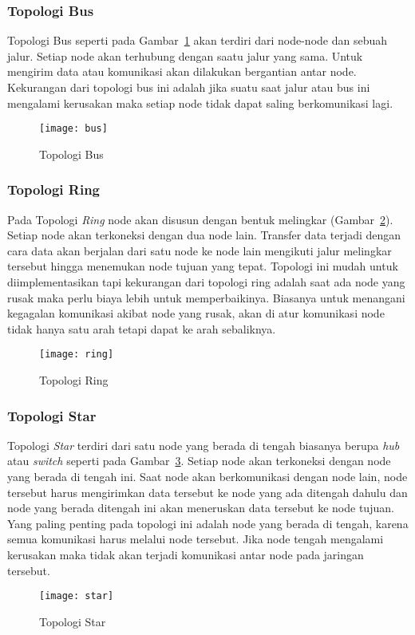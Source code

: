 \subsubsection{Topologi Bus}
Topologi Bus seperti pada Gambar~\ref{fig:bus} akan terdiri dari node-node dan sebuah jalur. Setiap node akan terhubung dengan saatu jalur yang sama. Untuk mengirim data atau komunikasi akan dilakukan bergantian antar node. Kekurangan dari topologi bus ini adalah jika suatu saat jalur atau bus ini mengalami kerusakan maka setiap node tidak dapat saling berkomunikasi lagi.
\begin{figure} [H]
	\centering  
	\texttt{[image: bus]}  
	\caption[Topologi Bus]{Topologi Bus} 
	\label{fig:bus} 
\end{figure} 

\subsubsection{Topologi Ring}
Pada Topologi \textit{Ring} node akan disusun dengan bentuk melingkar (Gambar~\ref{fig:ring}). Setiap node akan terkoneksi dengan dua node lain. Transfer data terjadi dengan cara data akan berjalan dari satu node ke node lain mengikuti jalur melingkar tersebut hingga menemukan node tujuan yang tepat. Topologi ini mudah untuk diimplementasikan tapi kekurangan dari topologi ring adalah saat ada node yang rusak maka perlu biaya lebih untuk memperbaikinya. Biasanya untuk menangani kegagalan komunikasi akibat node yang rusak, akan di atur komunikasi node tidak hanya satu arah tetapi dapat ke arah sebaliknya.
\begin{figure} [H]
	\centering  
	\texttt{[image: ring]}  
	\caption[Topologi Ring]{Topologi Ring} 
	\label{fig:ring} 
\end{figure} 

\subsubsection{Topologi Star}
Topologi \textit{Star} terdiri dari satu node yang berada di tengah biasanya berupa \textit{hub} atau \textit{switch} seperti pada Gambar~\ref{fig:star}. Setiap node akan terkoneksi dengan node yang berada di tengah ini. Saat node akan berkomunikasi dengan node lain, node tersebut harus mengirimkan data tersebut ke node yang ada ditengah dahulu dan node yang berada ditengah ini akan meneruskan data tersebut ke node tujuan. Yang paling penting pada topologi ini adalah node yang berada di tengah, karena semua komunikasi harus melalui node tersebut. Jika node tengah mengalami kerusakan maka tidak akan terjadi komunikasi antar node pada jaringan tersebut.
\begin{figure} [H]
	\centering  
	\texttt{[image: star]}  
	\caption[Topologi Star]{Topologi Star} 
	\label{fig:star} 
\end{figure} 

